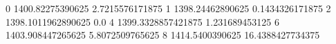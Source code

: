 0 1400.82275390625 2.7215576171875
1 1398.24462890625 0.1434326171875
2 1398.1011962890625 0.0
4 1399.3328857421875 1.231689453125
6 1403.908447265625 5.8072509765625
8 1414.5400390625 16.4388427734375
